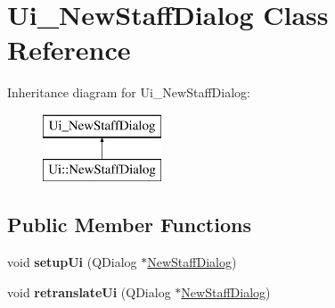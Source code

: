 \hypertarget{class_ui___new_staff_dialog}{}\section{Ui\+\_\+\+New\+Staff\+Dialog Class Reference}
\label{class_ui___new_staff_dialog}
Inheritance diagram for Ui\+\_\+\+New\+Staff\+Dialog\+:\begin{figure}[H]
\begin{center}
\leavevmode
\includegraphics[height=2.000000cm]{class_ui___new_staff_dialog}
\end{center}
\end{figure}
\subsection*{Public Member Functions}
\begin{DoxyCompactItemize}
\item 
\hypertarget{class_ui___new_staff_dialog_afd350b5820fa472c7d4e7b2bf57d8620}{}void {\bfseries setup\+Ui} (Q\+Dialog $\ast$\hyperlink{class_new_staff_dialog}{New\+Staff\+Dialog})\label{class_ui___new_staff_dialog_afd350b5820fa472c7d4e7b2bf57d8620}

\item 
\hypertarget{class_ui___new_staff_dialog_aa5cebfdc19be78310c286e5e77e99133}{}void {\bfseries retranslate\+Ui} (Q\+Dialog $\ast$\hyperlink{class_new_staff_dialog}{New\+Staff\+Dialog})\label{class_ui___new_staff_dialog_aa5cebfdc19be78310c286e5e77e99133}

\end{DoxyCompactItemize}
